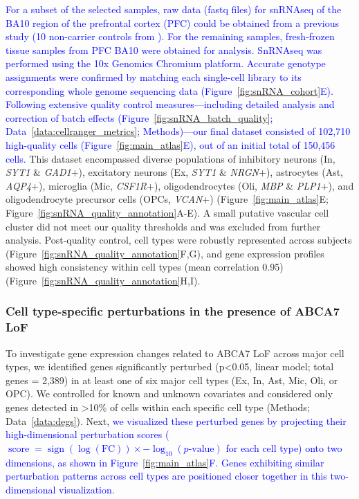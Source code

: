 \newcommand{\quoteE}{\textcolor{blue}{For a subset of the selected samples, raw data (fastq files) for snRNAseq of the BA10 region of the prefrontal cortex (PFC) could be obtained from a previous study (10 non-carrier controls from \cite{Mathys2019-wb}). For the remaining samples, fresh-frozen tissue samples from PFC BA10 were obtained for analysis. SnRNAseq was performed using the 10x Genomics Chromium platform. Accurate genotype assignments were confirmed by matching each single-cell library to its corresponding whole genome sequencing data (Figure~\ref{fig:snRNA_cohort}E). Following extensive quality control measures—including detailed analysis and correction of batch effects (Figure~\ref{fig:snRNA_batch_quality}; Data~\ref{data:cellranger_metrics}; Methods)—our final dataset consisted of 102,710 high-quality cells (Figure~\ref{fig:main_atlas}E), out of an initial total of 150,456 cells. \label{quoteE-label}}}
\quoteE This dataset encompassed diverse populations of inhibitory neurons (In, \textit{SYT1} \& \textit{GAD1}+), excitatory neurons (Ex, \textit{SYT1} \& \textit{NRGN}+), astrocytes (Ast, \textit{AQP4}+), microglia (Mic, \textit{CSF1R}+), oligodendrocytes (Oli, \textit{MBP} \& \textit{PLP1}+), and oligodendrocyte precursor cells (OPCs, \textit{VCAN}+) (Figure~\ref{fig:main_atlas}E; Figure~\ref{fig:snRNA_quality_annotation}A-E). A small putative vascular cell cluster did not meet our quality thresholds and was excluded from further analysis. Post-quality control, cell types were robustly represented across subjects (Figure~\ref{fig:snRNA_quality_annotation}F,G), and gene expression profiles showed high consistency within cell types (mean correlation 0.95) (Figure~\ref{fig:snRNA_quality_annotation}H,I).

\subsubsection{Cell type-specific perturbations in the presence of ABCA7 LoF}
To investigate gene expression changes related to ABCA7 LoF across major cell types, we identified genes significantly perturbed (p<0.05, linear model; total genes = 2,389) in at least one of six major cell types (Ex, In, Ast, Mic, Oli, or OPC). We controlled for known and unknown covariates and considered only genes detected in >10\% of cells within each specific cell type (Methods; Data~\ref{data:degs}). Next, \newcommand{\quoteF}{\textcolor{blue}{we visualized these perturbed genes by projecting their high-dimensional perturbation scores ($\operatorname{score} = \operatorname{sign}(\log(\text{FC})) \times -\log_{10}(p\text{-value})$ for each cell type) onto two dimensions, as shown in Figure~\ref{fig:main_atlas}F. Genes exhibiting similar perturbation patterns across cell types are positioned closer together in this two-dimensional visualization.\label{quoteF-label}}}\quoteF


